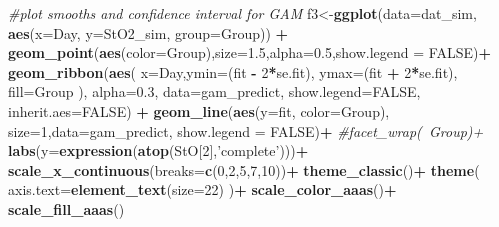 \documentclass[
]{article}
\newenvironment{Shaded}{\begin{snugshade}}{\end{snugshade}}
\newcommand{\CommentTok}[1]{\textcolor[rgb]{0.56,0.35,0.01}{\textit{#1}}}
\newcommand{\DataTypeTok}[1]{\textcolor[rgb]{0.13,0.29,0.53}{#1}}
\newcommand{\DecValTok}[1]{\textcolor[rgb]{0.00,0.00,0.81}{#1}}
\newcommand{\FloatTok}[1]{\textcolor[rgb]{0.00,0.00,0.81}{#1}}
\newcommand{\KeywordTok}[1]{\textcolor[rgb]{0.13,0.29,0.53}{\textbf{#1}}}
\newcommand{\NormalTok}[1]{#1}
\newcommand{\OperatorTok}[1]{\textcolor[rgb]{0.81,0.36,0.00}{\textbf{#1}}}
\newcommand{\OtherTok}[1]{\textcolor[rgb]{0.56,0.35,0.01}{#1}}
\newcommand{\StringTok}[1]{\textcolor[rgb]{0.31,0.60,0.02}{#1}}
\begin{document}
\begin{Shaded}
\begin{Highlighting}[]
{{\CommentTok{#plot smooths and confidence interval for GAM}
\NormalTok{f3<-}\KeywordTok{ggplot}\NormalTok{(}\DataTypeTok{data=}\NormalTok{dat_sim, }\KeywordTok{aes}\NormalTok{(}\DataTypeTok{x=}\NormalTok{Day, }\DataTypeTok{y=}\NormalTok{StO2_sim, }\DataTypeTok{group=}\NormalTok{Group)) }\OperatorTok{+}
\StringTok{    }\KeywordTok{geom_point}\NormalTok{(}\KeywordTok{aes}\NormalTok{(}\DataTypeTok{color=}\NormalTok{Group),}\DataTypeTok{size=}\FloatTok{1.5}\NormalTok{,}\DataTypeTok{alpha=}\FloatTok{0.5}\NormalTok{,}\DataTypeTok{show.legend =} \OtherTok{FALSE}\NormalTok{)}\OperatorTok{+}
\StringTok{  }\KeywordTok{geom_ribbon}\NormalTok{(}\KeywordTok{aes}\NormalTok{( }\DataTypeTok{x=}\NormalTok{Day,}\DataTypeTok{ymin=}\NormalTok{(fit }\OperatorTok{-}\StringTok{ }\DecValTok{2}\OperatorTok{*}\NormalTok{se.fit), }
                   \DataTypeTok{ymax=}\NormalTok{(fit }\OperatorTok{+}\StringTok{ }\DecValTok{2}\OperatorTok{*}\NormalTok{se.fit),}
                   \DataTypeTok{fill=}\NormalTok{Group}
\NormalTok{                   ),}
              \DataTypeTok{alpha=}\FloatTok{0.3}\NormalTok{,}
              \DataTypeTok{data=}\NormalTok{gam_predict,}
            \DataTypeTok{show.legend=}\OtherTok{FALSE}\NormalTok{,}
                \DataTypeTok{inherit.aes=}\OtherTok{FALSE}\NormalTok{) }\OperatorTok{+}
\StringTok{  }\KeywordTok{geom_line}\NormalTok{(}\KeywordTok{aes}\NormalTok{(}\DataTypeTok{y=}\NormalTok{fit,}
                \DataTypeTok{color=}\NormalTok{Group),}
              \DataTypeTok{size=}\DecValTok{1}\NormalTok{,}\DataTypeTok{data=}\NormalTok{gam_predict,}
              \DataTypeTok{show.legend =} \OtherTok{FALSE}\NormalTok{)}\OperatorTok{+}
\StringTok{  }\CommentTok{#facet_wrap(~Group)+}
\StringTok{  }\KeywordTok{labs}\NormalTok{(}\DataTypeTok{y=}\KeywordTok{expression}\NormalTok{(}\KeywordTok{atop}\NormalTok{(StO[}\DecValTok{2}\NormalTok{],}\StringTok{'complete'}\NormalTok{)))}\OperatorTok{+}
\StringTok{    }\KeywordTok{scale_x_continuous}\NormalTok{(}\DataTypeTok{breaks=}\KeywordTok{c}\NormalTok{(}\DecValTok{0}\NormalTok{,}\DecValTok{2}\NormalTok{,}\DecValTok{5}\NormalTok{,}\DecValTok{7}\NormalTok{,}\DecValTok{10}\NormalTok{))}\OperatorTok{+}
\StringTok{      }\KeywordTok{theme_classic}\NormalTok{()}\OperatorTok{+}
\StringTok{  }\KeywordTok{theme}\NormalTok{(}
    \DataTypeTok{axis.text=}\KeywordTok{element_text}\NormalTok{(}\DataTypeTok{size=}\DecValTok{22}\NormalTok{)}
\NormalTok{  )}\OperatorTok{+}
\StringTok{      }\KeywordTok{scale_color_aaas}\NormalTok{()}\OperatorTok{+}
\StringTok{  }\KeywordTok{scale_fill_aaas}\NormalTok{()}
 
}}
\end{Highlighting}
\end{Shaded}
\end{document}
